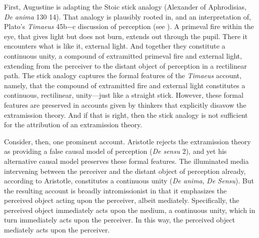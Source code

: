 \documentclass[12pt]{article}
\begin{document}
First, Augustine is adapting the Stoic stick analogy (Alexander of Aphrodisias, \emph{De anima} 130 14). That analogy is plausibly rooted in, and an interpretation of, Plato's \emph{Timaeus} 45b−c discussion of perception (see \citealt[chapter one]{Lindberg:1977aa}). A primeval fire within the eye, that gives light but does not burn, extends out through the pupil. There it encounters what is like it, external light. And together they constitute a continuous unity, a compound of extramitted primeval fire and external light, extending from the perceiver to the distant object of perception in a rectilinear path. The stick analogy captures the formal features of the \emph{Timaeus} account, namely, that the compound of extramitted fire and external light constitutes a continuous, rectilinear, unity---just like a straight stick. However, these formal features are preserved in accounts given by thinkers that explicitly disavow the extramission theory. And if that is right, then the stick analogy is not sufficient for the attribution of an extramission theory.

Consider, then, one prominent account. Aristotle rejects the extramission theory as providing a false causal model of perception (\emph{De sensu} 2), and yet his alternative causal model preserves these formal features. The illuminated media intervening between the perceiver and the distant object of perception already, according to Aristotle, constitutes a continuous unity (\emph{De anima}, \emph{De Sensu}). But the resulting account is broadly intromissionist in that it emphasizes the perceived object acting upon the perceiver, albeit mediately. Specifically, the perceived object immediately acts upon the medium, a continuous unity, which in turn immediately acts upon the perceiver. In this way, the perceived object mediately acts upon the perceiver.
\end{document}
